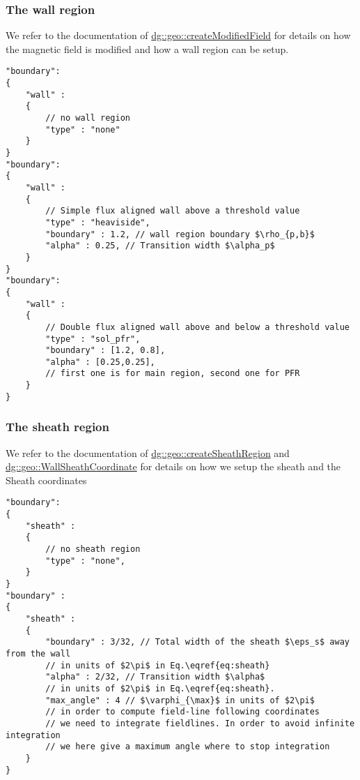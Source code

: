 \subsubsection{The wall region}\label{sec:wall}
We refer to the documentation of
\href{
https://mwiesenberger.github.io/feltor/geometries/html/group__wall.html#gac47e668c6483d6cebfc9d6c798737b58
}{dg::geo::createModifiedField} for details on how the magnetic field is modified
and how a wall region can be setup.
\begin{verbatim}
"boundary":
{
    "wall" :
    {
        // no wall region
        "type" : "none"
    }
}
"boundary":
{
    "wall" :
    {
        // Simple flux aligned wall above a threshold value
        "type" : "heaviside",
        "boundary" : 1.2, // wall region boundary $\rho_{p,b}$
        "alpha" : 0.25, // Transition width $\alpha_p$
    }
}
"boundary":
{
    "wall" :
    {
        // Double flux aligned wall above and below a threshold value
        "type" : "sol_pfr",
        "boundary" : [1.2, 0.8],
        "alpha" : [0.25,0.25],
        // first one is for main region, second one for PFR
    }
}
\end{verbatim}
\noindent

\subsubsection{The sheath region}\label{sec:sheath}
We refer to the documentation of \href{https://mwiesenberger.github.io/feltor/geometries/html/group__wall.html#gad4fce2a87b624a0d4df4c2431706988f}{dg::geo::createSheathRegion}
and
\href{https://mwiesenberger.github.io/feltor/geometries/html/structdg_1_1geo_1_1_wall_fieldline_coordinate.html}{dg::geo::WallSheathCoordinate}
for details on how we setup the sheath and the Sheath coordinates
\begin{verbatim}
"boundary":
{
    "sheath" :
    {
        // no sheath region
        "type" : "none",
    }
}
"boundary" :
{
    "sheath" :
    {
        "boundary" : 3/32, // Total width of the sheath $\eps_s$ away from the wall
        // in units of $2\pi$ in Eq.\eqref{eq:sheath}
        "alpha" : 2/32, // Transition width $\alpha$
        // in units of $2\pi$ in Eq.\eqref{eq:sheath}.
        "max_angle" : 4 // $\varphi_{\max}$ in units of $2\pi$
        // in order to compute field-line following coordinates
        // we need to integrate fieldlines. In order to avoid infinite integration
        // we here give a maximum angle where to stop integration
    }
}
\end{verbatim}
\noindent

